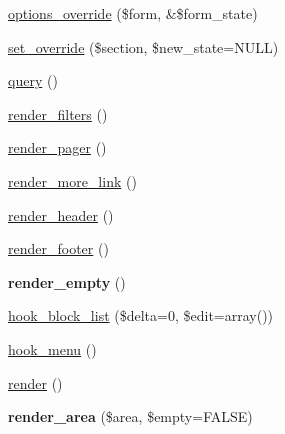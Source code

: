 \begin{DoxyCompactItemize}
\item 
\hyperlink{classviews__plugin__display_a6628fc7addb8376633ff63889e37256e}{options\_\-override} (\$form, \&\$form\_\-state)
\item 
\hyperlink{classviews__plugin__display_a06eae6326562b974ee8c3c8106a1c130}{set\_\-override} (\$section, \$new\_\-state=NULL)
\item 
\hyperlink{classviews__plugin__display_aefdc473b5cbe1c7eb4d0f5175d02184a}{query} ()
\item 
\hyperlink{classviews__plugin__display_a9bdc16c7066a51729cedb9235bc15e6f}{render\_\-filters} ()
\item 
\hyperlink{classviews__plugin__display_a0594f29620ea589280dee099666623c3}{render\_\-pager} ()
\item 
\hyperlink{classviews__plugin__display_ad680ce0ae6e6ed738ab9018f34e05703}{render\_\-more\_\-link} ()
\item 
\hyperlink{classviews__plugin__display_a3c0302020ed6b1e8d6a0be40760533d6}{render\_\-header} ()
\item 
\hyperlink{classviews__plugin__display_a4b2a49cfccca396da8206e95fddadc0a}{render\_\-footer} ()
\item 
\hypertarget{classviews__plugin__display_a80f1ef182222a316f4ca38ba1b4e1aa9}{
{\bfseries render\_\-empty} ()}
\label{classviews__plugin__display_a80f1ef182222a316f4ca38ba1b4e1aa9}

\item 
\hyperlink{classviews__plugin__display_a9b3fa020af70a4ae0b36742f6f5b1171}{hook\_\-block\_\-list} (\$delta=0, \$edit=array())
\item 
\hyperlink{classviews__plugin__display_af81f784641ab255c20044ef3e70efd1d}{hook\_\-menu} ()
\item 
\hyperlink{classviews__plugin__display_acf230a4b44b452c9469f5df92e58e32e}{render} ()
\item 
\hypertarget{classviews__plugin__display_a56f136aed0f2c6dc1cfc5dee05deba96}{
{\bfseries render\_\-area} (\$area, \$empty=FALSE)}
\label{classviews__plugin__display_a56f136aed0f2c6dc1cfc5dee05deba96}


\end{DoxyCompactItemize}
